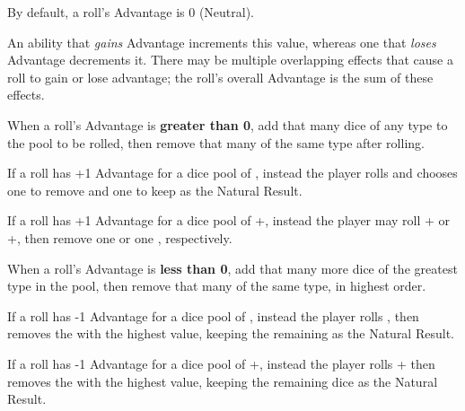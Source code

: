 \vspace{0.4em}

By default, a roll's Advantage is 0 (Neutral).

\vspace{0.4em}

An ability that \textit{gains} Advantage increments this value, 
whereas one that \textit{loses} Advantage decrements it.
There may be multiple overlapping effects that cause a roll 
to gain or lose advantage;
the roll's overall Advantage is the sum of these effects.

\vspace{0.4em}

When a roll's Advantage is \textbf{greater than 0}, 
add that many dice of any type to the pool to be rolled,
then remove that many of the same type after rolling.

\begin{Example}
  If a roll has +1 Advantage for a dice pool of , 
  instead the player rolls  and chooses one 
  to remove and one to keep as the Natural Result.

  \vspace{0.4em}

  If a roll has +1 Advantage for a dice pool of +,
  instead the player may roll + 
  or +, 
  then remove one  or one , respectively.
\end{Example}

\vspace{0.4em}

When a roll's Advantage is \textbf{less than 0}, 
add that many more dice of the greatest type in the pool, 
then remove that many of the same type,
in highest order.

\begin{Example}
  If a roll has -1 Advantage for a dice pool of , 
  instead the player rolls ,
  then removes the  with the highest value,
  keeping the remaining  as the Natural Result.

  \vspace{0.4em}

  If a roll has -1 Advantage for a dice pool of +,
  instead the player rolls + 
  then removes the  with the highest value,
  keeping the remaining dice as the Natural Result.
\end{Example}



